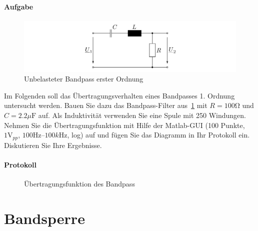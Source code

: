 \documentclass[10pt]{scrreprt}
\begin{document}
    \paragraph{Aufgabe}
    \begin{center}
        \begin{figure}[H]
            \includegraphics[width=\textwidth]{abb17.png}
            \caption{Unbelasteter Bandpass erster Ordnung}
            \label{fig:abb17}
        \end{figure}
    \end{center}
    Im Folgenden soll das Übertragungsverhalten eines Bandpasses 1. Ordnung untersucht
    werden. Bauen Sie dazu das Bandpass-Filter aus~\ref{fig:abb17} mit $R = 100 \si{\ohm}$ und $C = 2.2 \si{\mu\farad}$
    auf. Als Induktivität verwenden Sie eine Spule mit 250 Windungen.
    Nehmen Sie die Übertragungsfunktion mit Hilfe der Matlab-GUI (100 Punkte, $1\si{\volt}_{pp}$,
    $100\si{\hertz}$–$100\si{k\hertz}$, log) auf und fügen Sie das Diagramm in Ihr Protokoll ein. Diskutieren
    Sie Ihre Ergebnisse.

    \paragraph{Protokoll}
    \begin{center}
        \begin{figure}[H]
            \caption{Übertragungsfunktion des Bandpass}
        \end{figure}
    \end{center}

    \section{Bandsperre}
\end{document}
